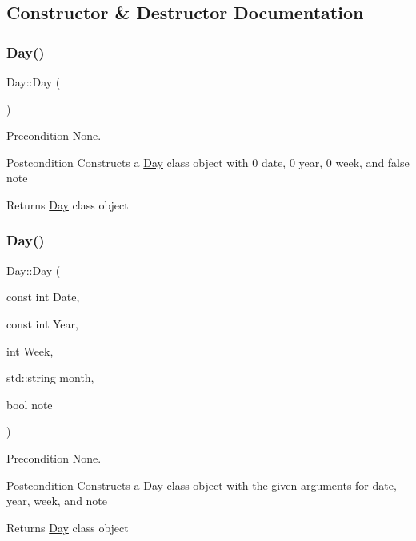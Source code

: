 \subsection{Constructor \& Destructor Documentation}
\hypertarget{class_day_a0d38b5839dd80b179cb8f0669283b3aa}{}\label{class_day_a0d38b5839dd80b179cb8f0669283b3aa} 
\subsubsection{\texorpdfstring{Day()}{Day()}\hspace{0.1cm}{\footnotesize\ttfamily [1/2]}}
{\footnotesize\ttfamily Day\+::\+Day (\begin{DoxyParamCaption}{ }\end{DoxyParamCaption})}

\begin{DoxyPrecond}{Precondition}
None. 
\end{DoxyPrecond}
\begin{DoxyPostcond}{Postcondition}
Constructs a \hyperlink{class_day}{Day} class object with 0 date, 0 year, 0 week, and \textquotesingle{}false\textquotesingle{} note 
\end{DoxyPostcond}
\begin{DoxyReturn}{Returns}
\hyperlink{class_day}{Day} class object 
\end{DoxyReturn}
\hypertarget{class_day_a1f2f885b1328511d8b96b050673ba35d}{}\label{class_day_a1f2f885b1328511d8b96b050673ba35d} 
\subsubsection{\texorpdfstring{Day()}{Day()}\hspace{0.1cm}{\footnotesize\ttfamily [2/2]}}
{\footnotesize\ttfamily Day\+::\+Day (\begin{DoxyParamCaption}\item[{const int}]{Date,  }\item[{const int}]{Year,  }\item[{int}]{Week,  }\item[{std\+::string}]{month,  }\item[{bool}]{note }\end{DoxyParamCaption})}

\begin{DoxyPrecond}{Precondition}
None. 
\end{DoxyPrecond}
\begin{DoxyPostcond}{Postcondition}
Constructs a \hyperlink{class_day}{Day} class object with the given arguments for date, year, week, and note 
\end{DoxyPostcond}
\begin{DoxyReturn}{Returns}
\hyperlink{class_day}{Day} class object 
\end{DoxyReturn}


